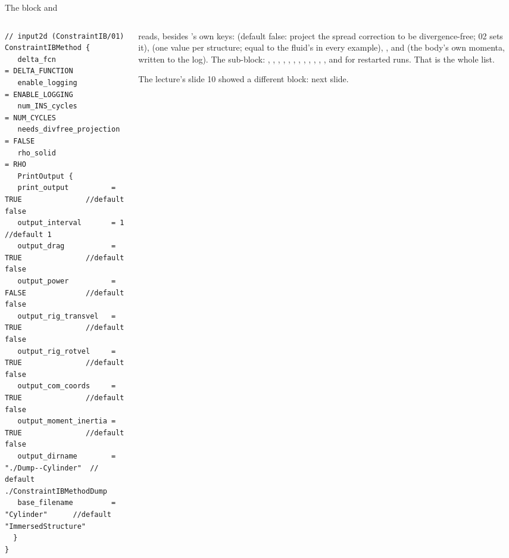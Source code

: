 \documentclass[aspectratio=169,11pt]{beamer}
\begin{document}
\begin{frame}[fragile]{The  block and }
\label{fr:method}
\vspace{-3pt}
\begin{columns}[T,onlytextwidth]
\begin{column}{0.46\textwidth}
\begin{lstlisting}[style=inputtiny]
// input2d (ConstraintIB/01)
ConstraintIBMethod {
   delta_fcn                = DELTA_FUNCTION
   enable_logging           = ENABLE_LOGGING
   num_INS_cycles           = NUM_CYCLES
   needs_divfree_projection = FALSE
   rho_solid                = RHO
   PrintOutput {
   print_output          = TRUE               //default false
   output_interval       = 1                  //default 1
   output_drag           = TRUE               //default false
   output_power          = FALSE              //default false
   output_rig_transvel   = TRUE               //default false
   output_rig_rotvel     = TRUE               //default false
   output_com_coords     = TRUE               //default false
   output_moment_inertia = TRUE               //default false
   output_dirname        = "./Dump--Cylinder"  // default ./ConstraintIBMethodDump
   base_filename         = "Cylinder"      //default  "ImmersedStructure"
  }
}
\end{lstlisting}
\end{column}
\begin{column}{0.52\textwidth}
\scriptsize {} reads, besides 's own keys:  (default false: project the spread correction to be divergence-free; 02 sets it),  (one value per structure; equal to the fluid's in every example), ,  and  (the body's own momenta, written to the log). The  sub-block: , , , , , , , , , , , , and  for restarted runs. That is the whole list.

\scriptsize The lecture's slide 10 showed a different block: next slide.
\end{column}
\end{columns}
\end{frame}
\end{document}
